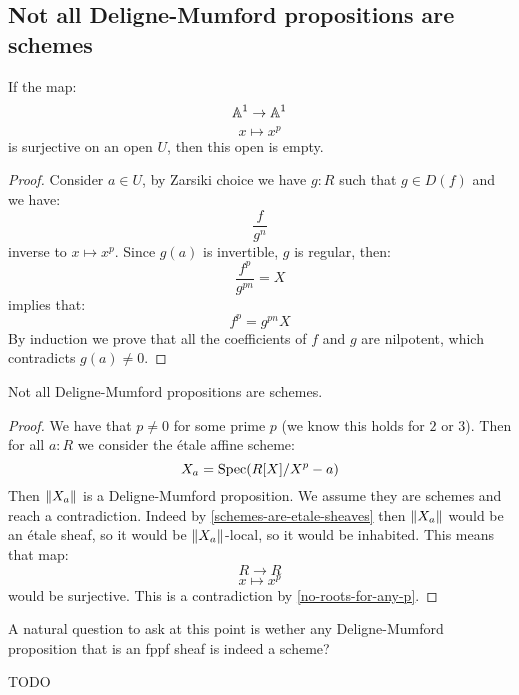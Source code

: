 \subsection{Not all Deligne-Mumford propositions are schemes}

\begin{lemma}\label{no-roots-for-any-p}
If the map:
\[\mathbb{A}^1\to \mathbb{A}^1\]
\[x\mapsto x^p\] 
is surjective on an open $U$, then this open is empty.
\end{lemma}

\begin{proof}
Consider $a\in U$, by Zarsiki choice we have $g:R$ such that $g\in D(f)$ and we have:
\[\frac{f}{g^n}\]
inverse to $x\mapsto x^p$. Since $g(a)$ is invertible, $g$ is regular, then:
\[\frac{f^p}{g^{pn}} = X\]
implies that:
\[f^p = g^{pn}X\]
By induction we prove that all the coefficients of $f$ and $g$ are nilpotent, which contradicts $g(a)\not=0$.
\end{proof}

\begin{proposition}
Not all Deligne-Mumford propositions are schemes.
\end{proposition}

\begin{proof}
We have that $p\not=0$ for some prime $p$ (we know this holds for $2$ or $3$). Then for all $a:R$ we consider the étale affine scheme:
\[X_a = \operatorname{Spec}(R[X]/X^p-a)\]
Then $\lVert X_a \rVert$ is a Deligne-Mumford proposition. We assume they are schemes and reach a contradiction. Indeed by \cref{schemes-are-etale-sheaves} then $\lVert X_a \rVert$ would be an étale sheaf, so it would be $\lVert X_a \rVert$-local, so it would be inhabited. This means that map:
\[R\to R\]
\[x\mapsto x^p\]
would be surjective. This is a contradiction by \cref{no-roots-for-any-p}.
\end{proof}

A natural question to ask at this point is wether any Deligne-Mumford proposition that is an fppf sheaf is indeed a scheme?

TODO
